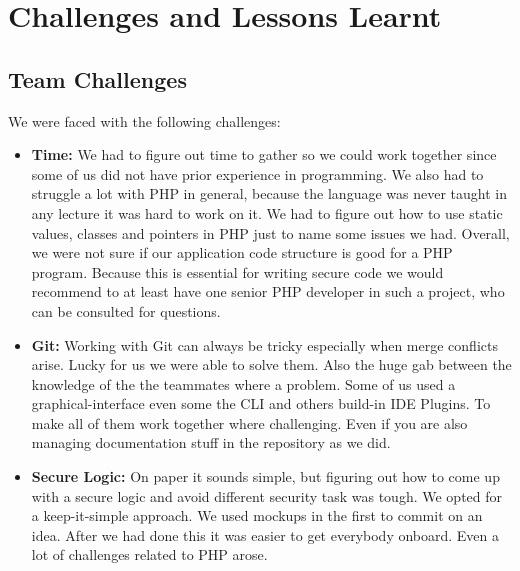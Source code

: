 \documentclass[12pt,a4paper]{article}
\begin{document}
\begin{flushleft}
	\end{flushleft}
	
	
	
	
	\section{Challenges and Lessons Learnt}
	\subsection{Team Challenges}
	\begin{flushleft}
	
		We were faced with the following challenges:
		\begin{itemize}
			\item \textbf{Time:} We had to figure out time to gather so we could work together since some of us did not have prior
			experience in programming. We also had to struggle a lot with PHP in general, because the language was never taught in any lecture it was hard to work on it. We had to figure out how to use static values, classes and pointers in PHP just to name some issues we had. Overall, we were not sure if our application code structure is good for a PHP program. Because this is essential for writing secure code we would recommend to at least have one senior PHP developer in such a project, who can be consulted for questions.
			\item \textbf{Git:} Working with Git can always be tricky especially when merge conflicts arise. Lucky for us we were able to solve them. Also the huge gab between the knowledge of the the teammates where a problem. Some of us used a graphical-interface even some the CLI and others build-in IDE Plugins. To make all of them work together where challenging. Even if you are also managing documentation stuff in the repository as we did. 
			\item \textbf{Secure Logic:} On paper it sounds simple, but figuring out how to come up with a secure logic and avoid different security task was tough. We opted for a keep-it-simple approach. We used mockups in the first to commit on an idea. After we had done this it was easier to get everybody onboard. Even a lot of challenges related to PHP arose. 
		\end{itemize}
		
	\end{flushleft}
	
	
\end{document}
